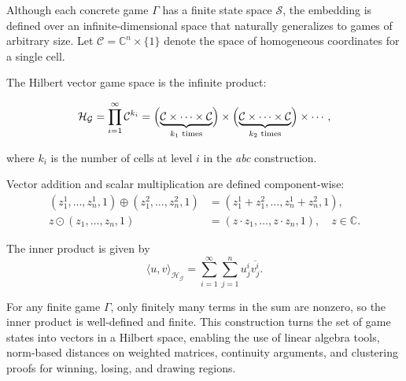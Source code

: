 \documentclass[11pt,a4paper]{article}
\theoremstyle{plain}
\theoremstyle{definition}
\begin{document}
\vspace{0.5em}	

Although each concrete game $\Gamma$ has a finite state space $\mathcal{S}$, the embedding is defined over an infinite-dimensional space that naturally generalizes to games of arbitrary size. Let $\mathcal{C} = \mathbb{C}^n \times \{1\}$ denote the space of homogeneous coordinates for a single cell.

\vspace{0.5em}	

The Hilbert vector game space is the infinite product:

\vspace{0.5em}

\begin{equation}
\mathcal{H}_\mathcal{G} 
= \prod_{i=1}^{\infty} \mathcal{C}^{k_i}
= \Bigl( \underbrace{\mathcal{C} \times \cdots \times \mathcal{C}}_{k_1\text{ times}} \Bigr) 
\times \Bigl( \underbrace{\mathcal{C} \times \cdots \times \mathcal{C}}_{k_2\text{ times}} \Bigr) 
\times \cdots,
\label{eq:hilbert_space_def}
\end{equation}

\vspace{0.5em}

where $k_i$ is the number of cells at level $i$ in the \emph{abc} construction.

\vspace{0.5em}

Vector addition and scalar multiplication are defined component-wise:
\begin{align}
(z^1_1, \dots, z^1_n, 1) \oplus (z^2_1, \dots, z^2_n, 1) 
&= (z^1_1 + z^2_1, \dots, z^1_n + z^2_n, 1), \label{eq:vector_addition} \\
z \odot (z_1, \dots, z_n, 1) 
&= (z \cdot z_1, \dots, z \cdot z_n, 1), \quad z \in \mathbb{C}. \label{eq:scalar_multiplication}
\end{align}

\vspace{0.5em}

The inner product is given by
\begin{equation}
\langle u, v \rangle_{\mathcal{H}_\mathcal{G}} 
= \sum_{i=1}^{\infty} \sum_{j=1}^{n} u^i_j \overline{v^i_j}.
\label{eq:inner_product}
\end{equation}

\vspace{0.5em}

For any finite game $\Gamma$, only finitely many terms in the sum are nonzero, so the inner product is well-defined and finite. This construction turns the set of game states into vectors in a Hilbert space, enabling the use of linear algebra tools, norm-based distances on weighted matrices, continuity arguments, and clustering proofs for winning, losing, and drawing regions.
\end{document}
